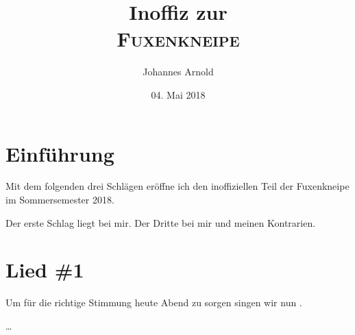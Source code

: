 \documentclass{kneipe}
\author{Johannes Arnold}
\title{Inoffiz zur\\\textsc{Fuxenkneipe}}
\date{04. Mai 2018}
\begin{document}
\maketitle
\newpage
\section*{Einführung}


Mit dem folgenden drei Schlägen eröffne ich den inoffiziellen Teil der Fuxenkneipe im Sommersemester 2018.

Der erste Schlag liegt bei mir. Der Dritte bei mir und meinen Kontrarien.

\schlaege


\lipsum[1]


\lipsum[2]

\section*{Lied \#1}
Um für die richtige Stimmung heute Abend zu sorgen singen wir nun .



\lipsum[3]

\colloquium


\silencium

\lipsum[4] \ldots
\end{document}
